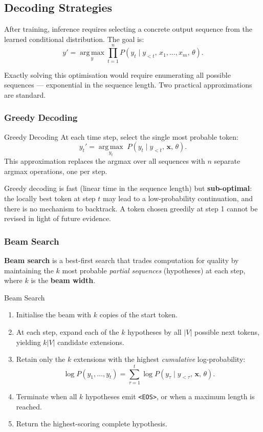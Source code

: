\documentclass[11pt,a4paper]{article}
\newcommand{\term}[1]{\textcolor{DefGreen}{\textbf{#1}}\index{#1}}
\begin{document}
\subsection{Decoding Strategies}
\label{sec:decoding}

After training, inference requires selecting a concrete output sequence from the learned conditional distribution. The goal is:
\[
  y' = \operatorname*{arg\,max}_{y} \prod_{t=1}^{n} P(y_t \mid y_{<t},\, x_1, \ldots, x_m,\, \theta).
\]

Exactly solving this optimisation would require enumerating all possible sequences — exponential in the sequence length. Two practical approximations are standard.

\subsubsection{Greedy Decoding}

\begin{defbox}{Greedy Decoding}
At each time step, select the single most probable token:
\[
  y_t' = \operatorname*{arg\,max}_{y_t}\; P(y_t \mid y_{<t},\, \mathbf{x},\, \theta).
\]
This approximation replaces the argmax over all sequences with $n$ separate argmax operations, one per step.
\end{defbox}

Greedy decoding is fast (linear time in the sequence length) but \textbf{sub-optimal}: the locally best token at step $t$ may lead to a low-probability continuation, and there is no mechanism to backtrack. A token chosen greedily at step 1 cannot be revised in light of future evidence.

\subsubsection{Beam Search}

\term{Beam search} is a best-first search that trades computation for quality by maintaining the $k$ most probable \emph{partial sequences} (hypotheses) at each step, where $k$ is the \term{beam width}.

\begin{algobox}{Beam Search}
\begin{enumerate}
  \item Initialise the beam with $k$ copies of the start token.
  \item At each step, expand each of the $k$ hypotheses by all $|V|$ possible next tokens, yielding $k|V|$ candidate extensions.
  \item Retain only the $k$ extensions with the highest \emph{cumulative} log-probability:
  \[
    \log P(y_1, \ldots, y_t) = \sum_{\tau=1}^{t} \log P(y_\tau \mid y_{<\tau},\, \mathbf{x},\, \theta).
  \]
  \item Terminate when all $k$ hypotheses emit \texttt{<EOS>}, or when a maximum length is reached.
  \item Return the highest-scoring complete hypothesis.
\end{enumerate}
\end{algobox}
\end{document}
